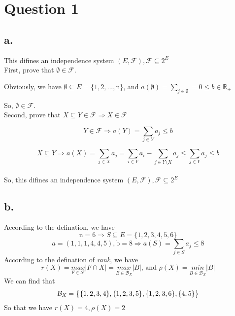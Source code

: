 \documentclass{article}
\begin{document}
\pagestyle{fancy}

\section*{Question 1}{
    \subsection*{a.}{
        This difines an independence system \((\mathit{E},\mathcal{F}), \mathcal{F} \subseteq \mathrm{2}^{\mathit{E}}\)\\

        First, prove that \(\emptyset \in \mathcal{F}\).

        Obviously, we have \(\emptyset \subseteq \mathit{E}=\{\mathrm{1,2,...,n}\}\), and \(\mathit{a}(\emptyset)=\sum_{\mathit{j} \in \emptyset}=\mathrm{0} \leqslant \mathit{b} \in \mathbb{R}_{+}\)

        So, \(\emptyset \in \mathcal{F}\).\\

        Second, prove that \(\mathit{X} \subseteq \mathit{Y} \in \mathcal{F} \Rightarrow \mathit{X} \in \mathcal{F}\)

        \[\mathit{Y} \in \mathcal{F} \Rightarrow \mathit{a}(\mathit{Y}) = \sum_{\mathit{j} \in \mathit{Y}}\mathit{a_j} \leqslant \mathit{b}\]

        \[\mathit{X} \subseteq \mathit{Y} \Rightarrow \mathit{a}(\mathit{X}) = \sum_{\mathit{j} \in \mathit{X}}\mathit{a_j} = \sum_{\mathit{i} \in \mathit{Y}}\mathit{a_i} - \sum_{\mathit{j} \in \mathit{Y} \setminus \mathit{X}}\mathit{a_j} \leqslant \sum_{\mathit{j} \in \mathit{Y}}\mathit{a_j} \leqslant \mathit{b}\]\\

        So, this difines an independence system \((\mathit{E},\mathcal{F}), \mathcal{F} \subseteq \mathrm{2}^{\mathit{E}}\)
    }
    \subsection*{b.}{
        According to the defination, we have
        \[\mathrm{n=6} \Rightarrow \mathit{S} \subseteq \mathit{E} = \{ \mathrm{1,2,3,4,5,6}\}\]
        \[\mathit{a}=\mathrm{(1,1,1,4,4,5), b=8} \Rightarrow \mathit{a}(\mathit{S}) = \sum_{\mathit{j} \in \mathit{S}}\mathit{a_j} \leqslant \mathrm{8}\]
        According to the defination of \textit{rank}, we have
        \[\mathit{r(X)}=\underset{\mathit{F} \in \mathcal{F}}{\mathit{max}} \lvert \mathit{F} \cap \mathit{X} \rvert=\underset{\mathit{B} \in \mathcal{B}_{\mathit{X}}} {\mathit{max}} \lvert \mathit{B} \rvert \text{, and } \mathit{\rho(X)} = \underset{\mathit{B} \in \mathcal{B}_{\mathit{X}}} {\mathit{min}} \lvert \mathit{B} \rvert\]
        We can find that
        \[\mathcal{B}_{\mathit{X}} = \mathrm{\big{\{} \{1,2,3,4\}, \{1,2,3,5\}, \{1,2,3,6\}, \{4,5\}\big{\}}}\]
        So that we have \(\mathit{r(X)}=\mathrm{4}, \mathit{\rho(X)}=\mathrm{2}\)
    }
}
\end{document}
